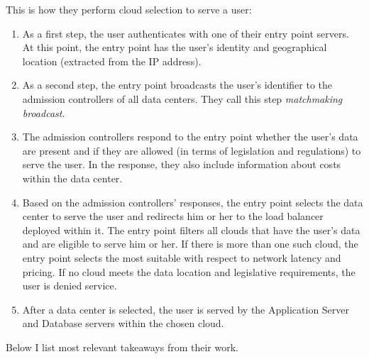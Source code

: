 \documentclass{uvamscse}
\begin{document}
This is how they perform cloud selection to serve a user:
\begin{enumerate}
  \item As a first step, the user authenticates with one of their entry point servers. At this point, the entry point has the user’s identity and geographical location (extracted from the IP address).
  \item As a second step, the entry point broadcasts the user’s identifier to the admission controllers of all data centers. They call this step \textit{matchmaking broadcast}.
  \item The admission controllers respond to the entry point whether the user’s data are present and if they are allowed (in terms of legislation and regulations) to serve the user. In the response, they also include information about costs within the data center.
  \item Based on the admission controllers’ responses, the entry point selects the data center to serve the user and redirects him or her to the load balancer deployed within it. The entry point filters all clouds that have the user’s data and are eligible to serve him or her. If there is more than one such cloud, the entry point selects the most suitable with respect to network latency and pricing. If no cloud meets the data location and legislative requirements, the user is denied service.
  \item After a data center is selected, the user is served by the Application Server and Database servers within the chosen cloud.
\end{enumerate}

Below I list most relevant takeaways from their work.
\end{document}
